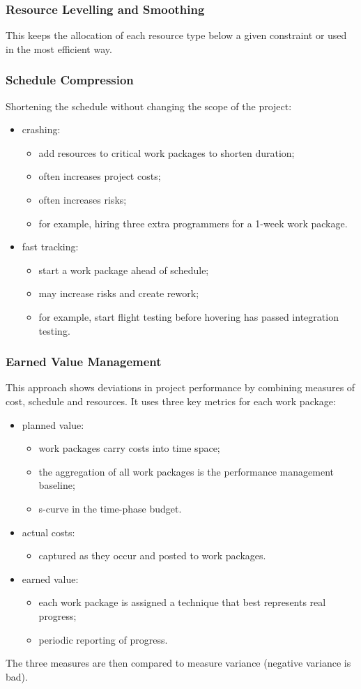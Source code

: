 \documentclass[journal]{IEEEtran}
\begin{document}
\subsubsection{Resource Levelling and Smoothing}
This keeps the allocation of each resource type below a given constraint or used in the most efficient way.
\subsubsection{Schedule Compression}
Shortening the schedule without changing the scope of the project:
\begin{itemize}
	\item crashing:
	\begin{itemize}
		\item add resources to critical work packages to shorten duration;
		\item often increases project costs;
		\item often increases risks;
		\item for example, hiring three extra programmers for a 1-week work package.
	\end{itemize}
	\item fast tracking:
	\begin{itemize}
		\item start a work package ahead of schedule;
		\item may increase risks and create rework;
		\item for example, start flight testing before hovering has passed integration testing.
	\end{itemize}
\end{itemize}
\subsubsection{Earned Value Management}
This approach shows deviations in project performance by combining measures of cost, schedule and resources. It uses three key metrics for each work package: \begin{itemize}
	\item planned value:
	\begin{itemize}
		\item work packages carry costs into time space;
		\item the aggregation of all work packages is the performance management baseline;
		\item s-curve in the time-phase budget.
	\end{itemize}
	\item actual costs:
	\begin{itemize}
		\item captured as they occur and posted to work packages.
	\end{itemize}
	\item earned value:
	\begin{itemize}
		\item each work package is assigned a technique that best represents real progress;
		\item periodic reporting of progress.
	\end{itemize}
\end{itemize}
The three measures are then compared to measure variance (negative variance is bad).
\end{document}
